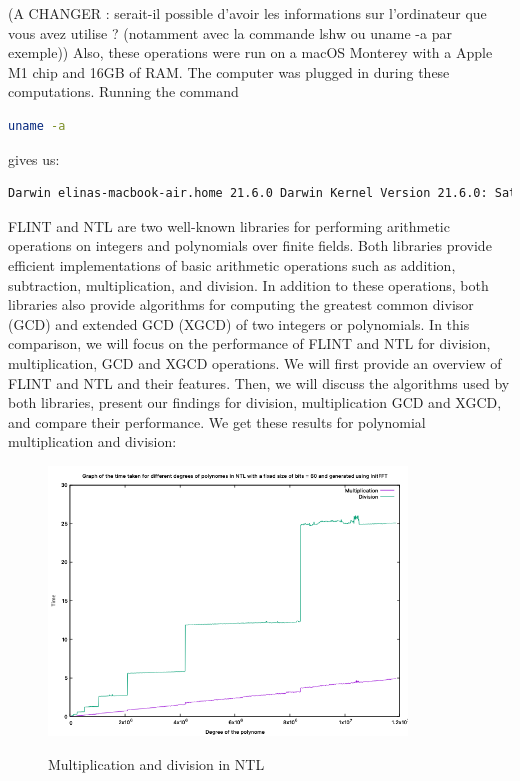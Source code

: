 (A CHANGER : serait-il possible d'avoir les informations sur l'ordinateur que vous avez utilise ? (notamment avec la commande lshw ou uname -a par exemple))
Also, these operations were run on a macOS Monterey with a Apple M1 chip and 16GB of RAM. The computer was plugged in during these computations.
Running the command 
\begin{lstlisting}[language=bash]
uname -a 
\end{lstlisting}
gives us:
\begin{lstlisting}[language=bash]
Darwin elinas-macbook-air.home 21.6.0 Darwin Kernel Version 21.6.0: Sat Jun 18 17:05:47 PDT 2022; root:xnu-8020.140.41~1/RELEASE_ARM64_T8101 arm64
\end{lstlisting}
FLINT and NTL are two well-known libraries for performing arithmetic operations on integers and polynomials over finite fields. Both libraries provide efficient implementations of basic arithmetic operations such as addition, subtraction, multiplication, and division. In addition to these operations, both libraries also provide algorithms for computing the greatest common divisor (GCD) and extended GCD (XGCD) of two integers or polynomials.
\newline 
In this comparison, we will focus on the performance of FLINT and NTL for division, multiplication, GCD and XGCD operations. 
\newline 
We will first provide an overview of FLINT and NTL and their features. Then, we will discuss the algorithms used by both libraries, present our findings for division, multiplication GCD and XGCD, and compare their performance. 
\newline
\newline We get these results for polynomial multiplication and division:
\begin{figure}[H]
    \centering
    \includegraphics[width=0.85\textwidth]{figures/ntl_mult_div.png}
    \label{fig2}
    \caption{Multiplication and division in NTL}
\end{figure}
